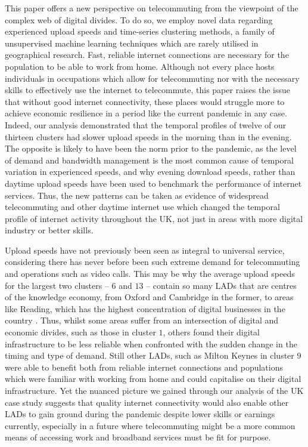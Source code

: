 \documentclass[Royal,times,sageh]{sagej}
\begin{document}
This paper offers a new perspective on telecommuting from the viewpoint
of the complex web of digital divides. To do so, we employ novel data
regarding experienced upload speeds and time-series clustering methods,
a family of unsupervised machine learning techniques which are rarely
utilised in geographical research. Fast, reliable internet connections
are necessary for the population to be able to work from home. Although
not every place hosts individuals in occupations which allow for
telecommuting nor with the necessary skills to effectively use the
internet to telecommute, this paper raises the issue that without good
internet connectivity, these places would struggle more to achieve
economic resilience in a period like the current pandemic in any case.
Indeed, our analysis demonstrated that the temporal profiles of twelve
of our thirteen clusters had slower upload speeds in the morning than in
the evening. The opposite is likely to have been the norm prior to the
pandemic, as the level of demand and bandwidth management is the most
common cause of temporal variation in experienced speeds, and why
evening download speeds, rather than daytime upload speeds have been
used to benchmark the performance of internet services. Thus, the new
patterns can be taken as evidence of widespread telecommuting and other
daytime internet use which changed the temporal profile of internet
activity throughout the UK, not just in areas with more digital industry
or better skills.

Upload speeds have not previously been seen as integral to universal
service, considering there has never before been such extreme demand for
telecommuting and operations such as video calls. This may be why the
average upload speeds for the largest two clusters -- \(6\) and \(13\)
-- contain so many LADs that are centres of the knowledge economy, from
Oxford and Cambridge in the former, to areas like Reading, which has the
highest concentration of digital businesses in the country
\citep{technation2017}. Thus, whilst some areas suffer from an
intersection of digital and economic divides, such as those in cluster
\(1\), others found their digital infrastructure to be less reliable
when confronted with the sudden change in the timing and type of demand.
Still other LADs, such as Milton Keynes in cluster \(9\) were able to
benefit both from reliable internet connections and populations which
were familiar with working from home and could capitalise on their
digital infrastructure. Yet the nuanced picture we gained through our
analysis of the UK case study suggests that quality internet
connectivity would also enable other LADs to gain ground during the
pandemic despite lower skills or earnings currently, especially in a
future where telecommuting might be a more common means of accessing
work and broadband services must be fit for purpose.
\end{document}
